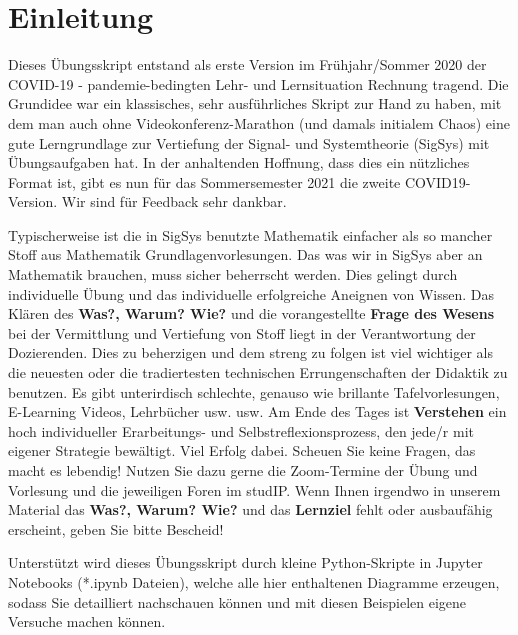 \newpage
\section*{Einleitung}
%
Dieses Übungsskript entstand als erste Version im Frühjahr/Sommer 2020 der
COVID-19 - pandemie-bedingten Lehr- und Lernsituation Rechnung tragend.
%
Die Grundidee war ein klassisches, sehr ausführliches Skript zur Hand zu haben, mit dem man auch ohne Videokonferenz-Marathon (und damals initialem Chaos) eine gute Lerngrundlage
zur Vertiefung der Signal- und Systemtheorie (SigSys) mit Übungsaufgaben hat.
%
In der anhaltenden Hoffnung, dass dies ein nützliches Format ist, gibt es nun für das Sommersemester 2021 die zweite COVID19-Version. Wir sind für Feedback sehr dankbar.

Typischerweise ist die in SigSys benutzte Mathematik einfacher als so mancher Stoff
aus Mathematik Grundlagenvorlesungen.
%
Das was wir in SigSys aber an Mathematik brauchen, muss sicher beherrscht werden.
%
Dies gelingt durch individuelle Übung und das individuelle erfolgreiche Aneignen
von Wissen.
%
Das Klären des \textbf{Was?, Warum? Wie?} und die vorangestellte \textbf{Frage des Wesens}
bei der Vermittlung und Vertiefung von Stoff liegt in der
Verantwortung der Dozierenden.
%
Dies zu beherzigen und dem streng zu folgen ist viel wichtiger als die neuesten
oder die tradiertesten technischen Errungenschaften der Didaktik zu benutzen.
%
Es gibt unterirdisch schlechte, genauso wie brillante Tafelvorlesungen,
E-Learning Videos, Lehrbücher usw. usw.
%
Am Ende des Tages ist \textbf{Verstehen} ein hoch individueller Erarbeitungs-
und Selbstreflexionsprozess, den jede/r mit eigener Strategie bewältigt.
%
Viel Erfolg dabei. Scheuen Sie keine Fragen, das macht es lebendig!
Nutzen Sie dazu gerne die Zoom-Termine der Übung und Vorlesung und die jeweiligen
Foren im studIP.
%
Wenn Ihnen irgendwo in unserem Material das \textbf{Was?, Warum? Wie?} und das
\textbf{Lernziel} fehlt oder ausbaufähig erscheint, geben Sie bitte Bescheid!

%
Unterstützt wird dieses Übungsskript durch kleine Python-Skripte in
Jupyter Notebooks (*.ipynb Dateien),
welche alle hier enthaltenen Diagramme erzeugen, sodass Sie
detailliert nachschauen können und mit diesen Beispielen eigene Versuche machen
können.
%


